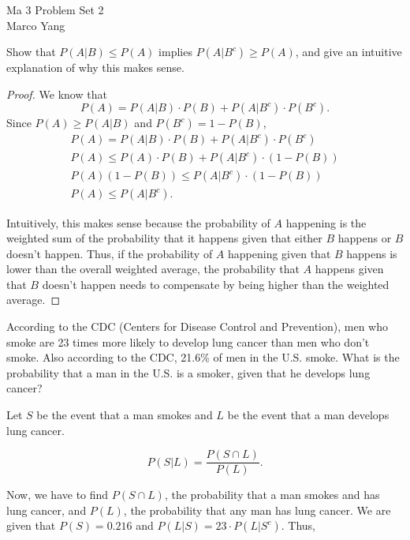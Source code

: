 \documentclass[answers]{exam}
\begin{document}
\begin{center}
{\Large Ma 3 Problem Set 2} \\
\medskip
Marco Yang \\
\bigskip
\end{center}

\begin{questions}
\question[10]
Show that \(P(A|B) \leq P(A)\) implies \(P(A|B^{c}) \geq P(A)\), and give an
intuitive explanation of why this makes sense.

\begin{solution}
\begin{proof}
We know that 
\[
P(A) = P(A | B) \cdot P(B) + P(A | B^{c}) \cdot P(B^{c})
.\] 
Since $P(A) \ge P(A|B)$ and $P(B^{c}) = 1 - P(B)$,
\begin{gather*}
P(A) = P(A | B) \cdot P(B) + P(A | B^{c}) \cdot P(B^{c}) \\
P(A) \le P(A) \cdot P(B) + P(A | B^{c}) \cdot (1 - P(B)) \\ 
P(A)(1 - P(B)) \le P(A|B^{c}) \cdot (1 - P(B)) \\ 
P(A) \le P(A|B^{c}).
\end{gather*}

Intuitively, this makes sense because the probability of $A$ happening is the
weighted sum of the probability that it happens given that either $B$ happens or
$B$ doesn't happen. Thus, if the probability of $A$ happening given that $B$
happens is lower than the overall weighted average, the probability that $A$
happens given that $B$ doesn't happen needs to compensate by being higher than
the weighted average.
\end{proof}
\end{solution}

\question[10]
According to the CDC (Centers for Disease Control and Prevention), men who smoke
are 23 times more likely to develop lung cancer than men who don't smoke. Also
according to the CDC, 21.6\% of men in the U.S. smoke. What is the probability
that a man in the U.S. is a smoker, given that he develops lung cancer?

\begin{solution}
Let $S$ be the event that a man smokes and $L$ be the event that a man develops
lung cancer.

\[
    P(S|L) = \frac{P(S \cap L)}{P(L)}
.\] 

Now, we have to find $P(S \cap L)$, the probability that a man smokes and has 
lung cancer, and $P(L)$, the probability that any man has lung cancer. We
are given that $P(S) = 0.216$ and $P(L|S) = 23 \cdot P(L|S^{c})$. Thus,


\end{solution}
\end{questions}
\end{document}
